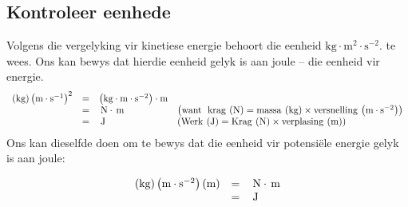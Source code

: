             \subsection*{Kontroleer eenhede}
            \nopagebreak
        \label{m38785*id67277}Volgens die vergelyking vir kinetiese energie behoort die eenheid $\text{kg}\ensuremath{\cdot}\text{m}{}^{2}\ensuremath{\cdot}\text{s}{}^{-2}$. te wees. Ons kan bewys dat hierdie eenheid gelyk is aan joule – die eenheid vir energie. 
        \label{m38785*id67329}\nopagebreak\noindent{}
    \begin{equation}
    \begin{array}{cccc}\hfill \left(\text{kg}\right){\left(\text{m}\ensuremath{\cdot}{\text{s}}^{-1}\right)}^{2}& =& \left(\text{kg}\ensuremath{\cdot}\text{m}\ensuremath{\cdot}{\text{s}}^{-2}\right)\ensuremath{\cdot}\text{m}\hfill & \\ & =& \phantom{\rule{0.166667em}{0ex}}\text{N}\ensuremath{\cdot}\phantom{\rule{0.166667em}{0ex}}\text{m}\hfill & \left(\text{want\; krag}\phantom{\rule{2pt}{0ex}}\left(\text{N}\right)=\text{massa}\phantom{\rule{2pt}{0ex}}\left(\text{kg}\right)\ensuremath{\times}\text{versnelling}\phantom{\rule{2pt}{0ex}}\left(\text{m}\ensuremath{\cdot}{\text{s}}^{-2}\right)\right)\hfill \\ & =& \phantom{\rule{0.166667em}{0ex}}\text{J}\hfill & \left(\text{Werk}\phantom{\rule{2pt}{0ex}}\left(\text{J}\right)=\text{Krag}\phantom{\rule{2pt}{0ex}}\left(\text{N}\right)\ensuremath{\times}\text{verplasing}\phantom{\rule{2pt}{0ex}}\left(\text{m}\right)\right)\hfill \end{array}
      \end{equation}
        \label{m38785*id67613}Ons kan dieselfde doen om te bewys dat die eenheid vir potensi\"{e}le energie gelyk is aan joule:\par 
        \label{m38785*id67619}\nopagebreak\noindent{}
          
    \begin{equation}
    \begin{array}{ccc}\hfill \left(\text{kg}\right)\left(\text{m}\ensuremath{\cdot}{\text{s}}^{-2}\right)\left(\text{m}\right)& =& \phantom{\rule{0.166667em}{0ex}}\text{N}\ensuremath{\cdot}\phantom{\rule{0.166667em}{0ex}}\text{m}\hfill \\ & =& \phantom{\rule{0.166667em}{0ex}}\text{J}\hfill \end{array}
      \end{equation}
\par
            \label{m38785*secfhsst!!!underscore!!!id1394}\vspace{.5cm} 

